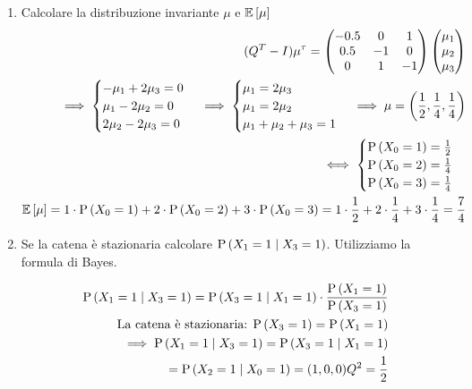 \begin{exrc}
\begin{enumerate}
		\item Calcolare la distribuzione invariante $ \mu $ e $ \mathbb{E}\left[\mu\right] $ 
		\begin{equation*}
			\begin{aligned}
			(Q^T-I)\mu^\tau = \begin{pmatrix}
			-0.5 & 0 & 1 \\
			0.5 & -1 & 0 \\
			0 & 1 & -1
			\end{pmatrix} \begin{pmatrix}
			\mu_1 \\ \mu_2 \\ \mu_3
			\end{pmatrix} \\
			\implies \begin{cases}
			- \mu_1 + 2\mu_3 = 0 \\ 
			\mu_1 - 2\mu_2 = 0 \\
			2\mu_2 - 2\mu_3 = 0
			\end{cases} \implies \begin{cases}
			\mu_1 = 2\mu_3 \\
			\mu_1 = 2\mu_2 \\
			\mu_1 + \mu_2 + \mu_3 = 1
			\end{cases} 
			\implies \mu = \left(\dfrac{1}{2}, \dfrac{1}{4}, \dfrac{1}{4}\right) \\ 
			\iff \begin{cases}
			\text{P}\left(X_0 = 1\right) = \frac{1}{2} \\
			\text{P}\left(X_0 = 2\right) = \frac{1}{4} \\
			\text{P}\left(X_0 = 3\right) = \frac{1}{4} \\	
			\end{cases} \\
			\mathbb{E}\left[\mu\right] = 1 \cdot \text{P}\left(X_0 = 1\right)  + 2 \cdot \text{P}\left(X_0 = 2\right)  + 3 \cdot \text{P}\left(X_0 =3 \right) =  1 \cdot \dfrac{1}{2} + 2 \cdot \dfrac{1}{4} + 3 \cdot \dfrac{1}{4} = \dfrac{7}{4}
			\end{aligned} 
		\end{equation*}
		
		\item Se la catena \`e  stazionaria calcolare $ \text{P}\left(X_1 = 1 \mid X_3 = 1\right) $. Utilizziamo la formula di Bayes. 
		
		\begin{equation*}
			\begin{aligned}
			\text{P}\left(X_1 = 1 \mid X_3 = 1\right) = \text{P}\left(X_3 = 1 \mid X_1 = 1\right) \cdot \dfrac{\text{P}\left(X_1 = 1\right)}{\text{P}\left(X_3 = 1\right)} \\
			\text{La catena \`e  stazionaria: } \text{P}\left(X_3 = 1\right) = \text{P}\left(X_1 = 1\right) \\
			\implies \text{P}\left(X_1 = 1 \mid X_3 = 1\right) = \text{P}\left(X_3 = 1 \mid X_1 = 1\right) \\ 
			= \text{P}\left(X_2 = 1 \mid X_0 = 1\right) = (1, 0, 0) Q^2 = \dfrac{1}{2}
			\end{aligned}
		\end{equation*}
	\end{enumerate}
\end{exrc}






